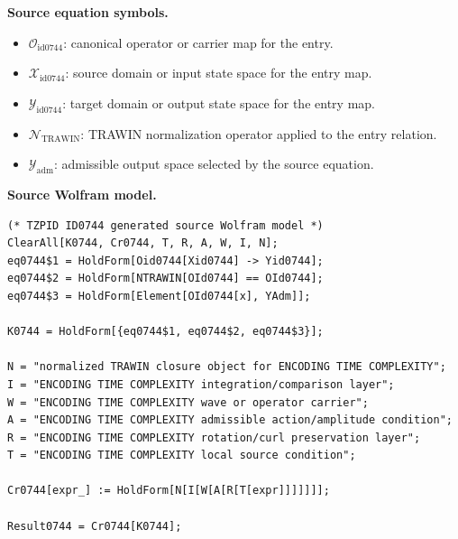 \begin{minipage}[t]{0.49\linewidth}
\begingroup
\small
\raggedright
\textbf{Source equation symbols.}\par
\begin{itemize}[leftmargin=1.35em,itemsep=1pt,topsep=1pt,parsep=0pt]
    \item $\mathcal{O}_{\mathrm{id0744}}$: canonical operator or carrier map for the entry.
    \item $\mathcal{X}_{\mathrm{id0744}}$: source domain or input state space for the entry map.
    \item $\mathcal{Y}_{\mathrm{id0744}}$: target domain or output state space for the entry map.
    \item $\mathcal{N}_{\mathrm{TRAWIN}}$: TRAWIN normalization operator applied to the entry relation.
    \item $\mathcal{Y}_{\mathrm{adm}}$: admissible output space selected by the source equation.
\end{itemize}
\endgroup
\end{minipage}\hfill
\begin{minipage}[t]{0.47\linewidth}
\begingroup
\scriptsize
\raggedright
\textbf{Source Wolfram model.}\par
\begin{Verbatim}[fontsize=\tiny,breaklines=true,breakanywhere=true]
(* TZPID ID0744 generated source Wolfram model *)
ClearAll[K0744, Cr0744, T, R, A, W, I, N];
eq0744$1 = HoldForm[Oid0744[Xid0744] -> Yid0744];
eq0744$2 = HoldForm[NTRAWIN[OId0744] == OId0744];
eq0744$3 = HoldForm[Element[OId0744[x], YAdm]];

K0744 = HoldForm[{eq0744$1, eq0744$2, eq0744$3}];

N = "normalized TRAWIN closure object for ENCODING TIME COMPLEXITY";
I = "ENCODING TIME COMPLEXITY integration/comparison layer";
W = "ENCODING TIME COMPLEXITY wave or operator carrier";
A = "ENCODING TIME COMPLEXITY admissible action/amplitude condition";
R = "ENCODING TIME COMPLEXITY rotation/curl preservation layer";
T = "ENCODING TIME COMPLEXITY local source condition";

Cr0744[expr_] := HoldForm[N[I[W[A[R[T[expr]]]]]]];

Result0744 = Cr0744[K0744];
\end{Verbatim}
\endgroup
\end{minipage}

